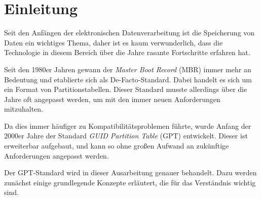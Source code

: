 \section{Einleitung}
Seit den Anfängen der elektronischen Datenverarbeitung ist die Speicherung von Daten ein wichtiges Thema, daher ist es kaum verwunderlich, dass die Technologie in diesem Bereich über die Jahre rasante Fortschritte erfahren hat.

Seit den 1980er Jahren gewann der \textit{Master Boot Record} (MBR) immer mehr an Bedeutung und etablierte sich als De-Facto-Standard.
Dabei handelt es sich um ein Format von Partitionstabellen.
Dieser Standard musste allerdings über die Jahre oft angepasst werden, um mit den immer neuen Anforderungen mitzuhalten.

Da dies immer häufiger zu Kompatibilitätsproblemen führte, wurde Anfang der 2000er Jahre der Standard \textit{GUID Partition Table} (GPT) entwickelt.
Dieser ist erweiterbar aufgebaut, und kann so ohne großen Aufwand an zukünftige Anforderungen angepasst werden.

Der GPT-Standard wird in dieser Ausarbeitung genauer behandelt.
Dazu werden zunächst einige grundlegende Konzepte erläutert, die für das Verständnis wichtig sind.
